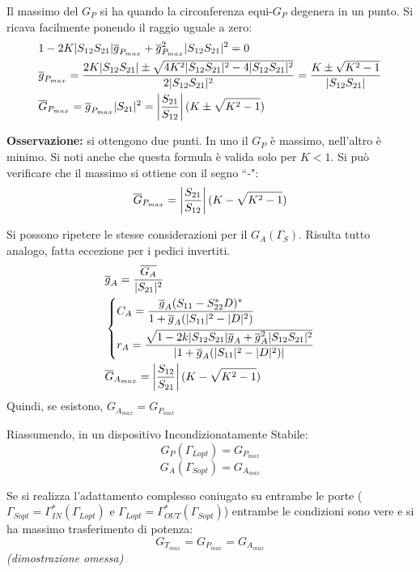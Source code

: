 Il massimo del $G_P$ si ha quando la circonferenza equi-$G_P$ degenera in un punto. Si ricava facilmente ponendo il raggio uguale a zero:
\begin{align*}
&1 - 2K|S_{12} S_ {21}| \overline{g}_{P_{max}} + \overline{g}_{P_{max}}^2 |S_{12} S_{21}|^2 = 0
\\
&\overline{g}_{P_{max}} =
\frac{2K|S_{12}S_{21}| \pm \sqrt{4K^2|S_{12}S_{21}|^2 - 4 |S_{12}S_{21}|^2}}{2|S_{12}S_{21}|^2} = \frac{K \pm \sqrt{K^2 -1}}{|S_{12}S_{21}|}
\\
&\overline{G}_{P_{max}} = \overline{g}_{P_{max}} |S_{21}|^2 =  \left|\frac{S_{21}}{S_{12}}\right| (K \pm \sqrt{K^2 -1})
\end{align*}

\textbf{Osservazione:} si ottengono due punti. In uno il $G_P$ è massimo, nell'altro è minimo. Si noti anche che questa formula è valida solo per $K<1$. Si può verificare che il massimo si ottiene con il segno ``-":
\[\overline{G}_{P_{max}} =  \left|\frac{S_{21}}{S_{12}}\right| (K - \sqrt{K^2 -1})  \]

Si possono ripetere le stesse considerazioni per il $G_A(\Gamma_S)$. Risulta tutto analogo, fatta eccezione per i pedici invertiti.
\begin{align}
&\overline{g}_A = \frac{\overline{G_A}}{|S_{21}|^2}
\nonumber\\
&
\begin{dcases}
	C_{A} =\frac{\overline{g}_A (S_{11} - S_{22}^* D)^*}
	{1+\overline{g}_A(|S_{11}|^2 - |D|^2)}\\
	r_{A} = {\frac{\sqrt{1 - 2 k |S_{12}S_{21}|\overline{g}_A + \overline{g}_A^2 |S_{12} S_{21}|^2}}{|1+\overline{g}_A(|S_{11}|^2 - |D|^2)|}}
\end{dcases}
\\
&\overline{G}_{A_{max}} =  \left|\frac{S_{12}}{S_{21}}\right| (K - \sqrt{K^2 -1})
\nonumber
\end{align}
Quindi, se esistono, $G_{A_{max}} = G_{P_{max}}$

Riassumendo, in un dispositivo Incondizionatamente Stabile:
\[G_P (\Gamma_{Lopt}) = G_{P_{max}}\]
\[G_A (\Gamma_{Sopt}) = G_{A_{max}}\]

Se si realizza l'adattamento complesso coniugato su entrambe le porte ($\Gamma_{Sopt} = \Gamma_{IN}^* (\Gamma_{Lopt})$ e $\Gamma_{Lopt} = \Gamma_{OUT}^* (\Gamma_{Sopt})$) entrambe le condizioni sono vere e si ha massimo trasferimento di potenza:
\[G_{T_{max}} = G_{P_{max}} = G_{A_{max}} \]
\textit{(dimostrazione omessa)}


